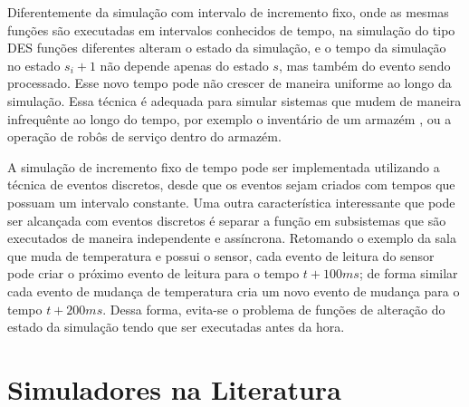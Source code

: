 Diferentemente da simulação com intervalo de incremento fixo, onde as mesmas funções são executadas em intervalos conhecidos de tempo, na simulação do tipo DES funções diferentes alteram o estado da simulação, e o tempo da simulação no estado $s_i+1$ não depende apenas do estado $s$, mas também do evento sendo processado. Esse novo tempo pode não crescer de maneira uniforme ao longo da simulação. Essa técnica é adequada para simular sistemas que mudem de maneira infrequênte ao longo do tempo, por exemplo o inventário de um armazém \cite{belanger2010aboutsimulation}, ou a operação de robôs de serviço dentro do armazém. 

A simulação de incremento fixo de tempo pode ser implementada utilizando a técnica de eventos discretos, desde que os eventos sejam criados com tempos que possuam um intervalo constante. Uma outra característica interessante que pode ser alcançada com eventos discretos é separar a função em subsistemas que são executados de maneira independente e assíncrona. Retomando o exemplo da sala que muda de temperatura e possui o sensor, cada evento de leitura do sensor pode criar o próximo evento de leitura para o tempo $t + 100ms$; de forma similar cada evento de mudança de temperatura cria um novo evento de mudança para o tempo $t + 200ms$. Dessa forma, evita-se o problema de funções de alteração do estado da simulação tendo que ser executadas antes da hora.

\section{Simuladores na Literatura}
\label{sec:outros_simuladores}